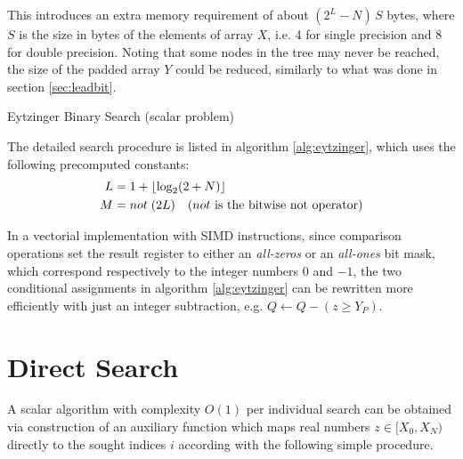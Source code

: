 \documentclass[preprint,1p,times]{elsarticle}
\begin{document}
This introduces an extra memory requirement of about $(2^L-N)\,S$ bytes, where $S$ is the size in bytes of the elements of array $X$, i.e. 4 for single precision and 8 for double precision. Noting that some nodes in the tree may never be reached, the size of the padded array $Y$ could be reduced, similarly to what was done in section \ref{sec:leadbit}.

\begin{algorithm}[ht]
	\caption{Eytzinger Binary Search (scalar problem)}
	\label{alg:eytzinger}
	\begin{algorithmic}
		  
		\EndIf
		  
		\EndIf
		\EndWhile
		
		 
		
		\EndFunction
	\end{algorithmic}
\end{algorithm}

The detailed search procedure is listed in algorithm \ref{alg:eytzinger}, which uses the following precomputed constants:
\begin{align*}
	L&=1+\left \lfloor \log_2(2+N) \right \rfloor \\
	M&= not \; (2L) \quad (not \text{ is the bitwise not operator})
\end{align*}

In a vectorial implementation with SIMD instructions, since comparison operations set the result register to either an \textit{all-zeros} or an \textit{all-ones} bit mask, which correspond respectively to the integer numbers $0$ and $-1$, the two conditional assignments in algorithm \ref{alg:eytzinger} can be rewritten more efficiently with just an integer subtraction, e.g. $Q \leftarrow Q - (z \geq Y_P)$.




\section{Direct Search}
\label{sec:directmethod}
A scalar algorithm with complexity $O(1)$ per individual search can be obtained via construction of an auxiliary function which maps real numbers $z\in[X_{0},X_{N})$ directly to the sought indices $i$ according with the following simple procedure.
\end{document}

